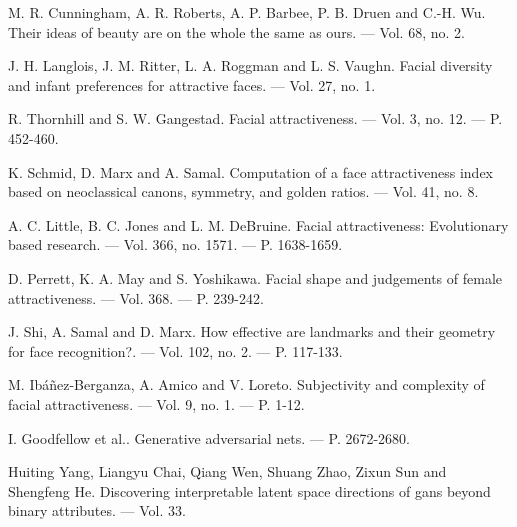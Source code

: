 \documentclass[60x84/16,8pt]{ittmm}
\begin{document}
\begin{thebibliography}{99}

M. R. Cunningham, A. R. Roberts, A. P. Barbee, P. B. Druen and C.-H. Wu.
Their ideas of beauty are on the whole the same as ours. 
--- Vol. 68, no. 2.

J. H. Langlois, J. M. Ritter, L. A. Roggman and L. S. Vaughn.
Facial diversity and infant preferences for attractive faces. 
--- Vol. 27, no. 1.

R. Thornhill and S. W. Gangestad.
Facial attractiveness. 
--- Vol. 3, no. 12. 
--- P. 452-460.

K. Schmid, D. Marx and A. Samal.
Computation of a face attractiveness index based on neoclassical canons, symmetry, and golden ratios. 
--- Vol. 41, no. 8.

A. C. Little, B. C. Jones and L. M. DeBruine.
Facial attractiveness: Evolutionary based research. 
--- Vol. 366, no. 1571.
--- P. 1638-1659.

D. Perrett, K. A. May and S. Yoshikawa.
Facial shape and judgements of female attractiveness.
--- Vol. 368.
--- P. 239-242.

J. Shi, A. Samal and D. Marx.
How effective are landmarks and their geometry for face recognition?. 
--- Vol. 102, no. 2.
--- P. 117-133.

M. Ibáñez-Berganza, A. Amico and V. Loreto.
Subjectivity and complexity of facial attractiveness. 
--- Vol. 9, no. 1.
--- P. 1-12.

I. Goodfellow et al..
Generative adversarial nets. 
--- P. 2672-2680.

Huiting Yang, Liangyu Chai, Qiang Wen, Shuang Zhao, Zixun Sun and Shengfeng He.
Discovering interpretable latent space directions of gans beyond binary attributes. 
--- Vol. 33.






\end{thebibliography}
\end{document}
